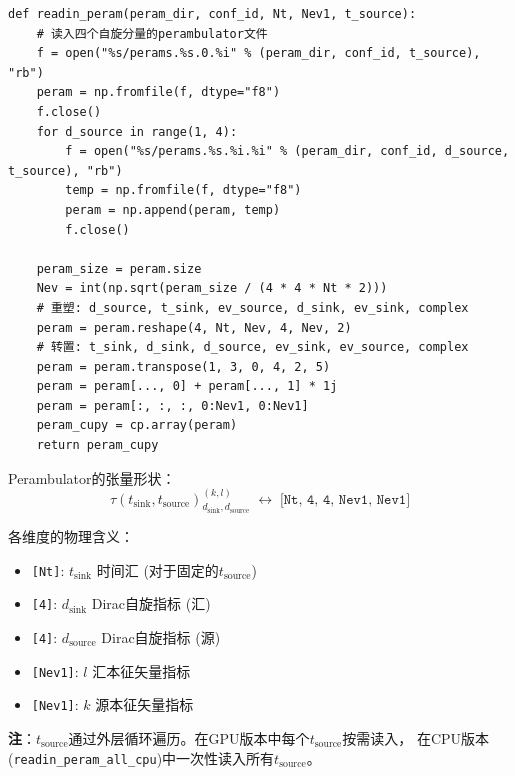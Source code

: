 \documentclass[12pt,a4paper]{ctexart}
\begin{document}
\begin{codebox}
\begin{lstlisting}[style=pythonstyle]
def readin_peram(peram_dir, conf_id, Nt, Nev1, t_source):
    # 读入四个自旋分量的perambulator文件
    f = open("%s/perams.%s.0.%i" % (peram_dir, conf_id, t_source), "rb")
    peram = np.fromfile(f, dtype="f8")
    f.close()
    for d_source in range(1, 4):
        f = open("%s/perams.%s.%i.%i" % (peram_dir, conf_id, d_source, t_source), "rb")
        temp = np.fromfile(f, dtype="f8")
        peram = np.append(peram, temp)
        f.close()

    peram_size = peram.size
    Nev = int(np.sqrt(peram_size / (4 * 4 * Nt * 2)))
    # 重塑: d_source, t_sink, ev_source, d_sink, ev_sink, complex
    peram = peram.reshape(4, Nt, Nev, 4, Nev, 2)
    # 转置: t_sink, d_sink, d_source, ev_sink, ev_source, complex
    peram = peram.transpose(1, 3, 0, 4, 2, 5)
    peram = peram[..., 0] + peram[..., 1] * 1j
    peram = peram[:, :, :, 0:Nev1, 0:Nev1]
    peram_cupy = cp.array(peram)
    return peram_cupy
\end{lstlisting}
\end{codebox}

\begin{physbox}[Perambulator张量结构]
Perambulator的张量形状：
\begin{equation}
    \tau(t_{\text{sink}}, t_{\text{source}})_{d_{\text{sink}}, d_{\text{source}}}^{(k,l)}
    \;\longleftrightarrow\; \texttt{[Nt, 4, 4, Nev1, Nev1]}
\end{equation}

各维度的物理含义：
\begin{itemize}
    \item \texttt{[Nt]}: $t_{\text{sink}}$ 时间汇 (对于固定的$t_{\text{source}}$)
    \item \texttt{[4]}: $d_{\text{sink}}$ Dirac自旋指标 (汇)
    \item \texttt{[4]}: $d_{\text{source}}$ Dirac自旋指标 (源)
    \item \texttt{[Nev1]}: $l$ 汇本征矢量指标
    \item \texttt{[Nev1]}: $k$ 源本征矢量指标
\end{itemize}

\textbf{注}：$t_{\text{source}}$通过外层循环遍历。在GPU版本中每个$t_{\text{source}}$按需读入，
在CPU版本(\texttt{readin\_peram\_all\_cpu})中一次性读入所有$t_{\text{source}}$。
\end{physbox}
\end{document}
